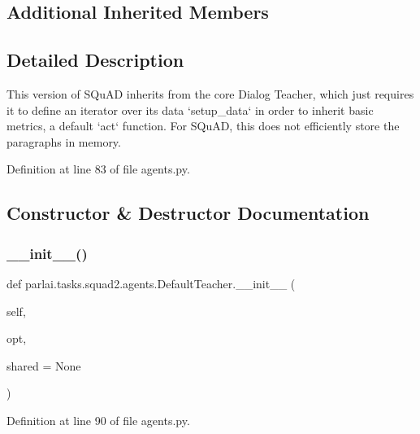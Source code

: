 \subsection*{Additional Inherited Members}


\subsection{Detailed Description}
\begin{DoxyVerb}This version of SQuAD inherits from the core Dialog Teacher, which just
requires it to define an iterator over its data `setup_data` in order to
inherit basic metrics, a default `act` function.
For SQuAD, this does not efficiently store the paragraphs in memory.
\end{DoxyVerb}
 

Definition at line 83 of file agents.\+py.



\subsection{Constructor \& Destructor Documentation}
\mbox{\label{classparlai_1_1tasks_1_1squad2_1_1agents_1_1DefaultTeacher_aa97ab84de16c6d73501fef0c11bb1608}} 
\subsubsection{\texorpdfstring{\+\_\+\+\_\+init\+\_\+\+\_\+()}{\_\_init\_\_()}}
{\footnotesize\ttfamily def parlai.\+tasks.\+squad2.\+agents.\+Default\+Teacher.\+\_\+\+\_\+init\+\_\+\+\_\+ (\begin{DoxyParamCaption}\item[{}]{self,  }\item[{}]{opt,  }\item[{}]{shared = {\ttfamily None} }\end{DoxyParamCaption})}



Definition at line 90 of file agents.\+py.



